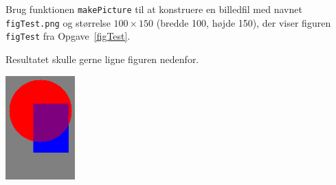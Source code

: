 Brug funktionen \texttt{makePicture} til at konstruere en billedfil med navnet
\texttt{figTest.png} og størrelse $100\times150$ (bredde 100, højde 150),
der viser figuren \texttt{figTest} fra Opgave~\ref{figTest}.

Resultatet skulle gerne ligne figuren nedenfor.
\begin{center}
  \includegraphics[width=0.2\textwidth]{figTest.png}
\end{center}

